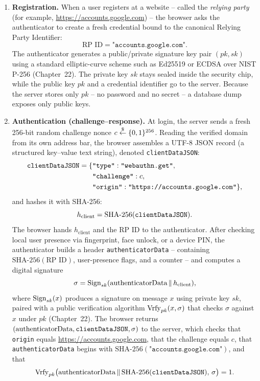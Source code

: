 \begin{enumerate}
  \item \textbf{Registration.} When a user registers at a website -- called the \emph{relying party} (for example, \url{https://accounts.google.com}) -- the browser asks the authenticator to create a fresh credential bound to the canonical Relying Party Identifier:
  \[
    \text{RP ID} = \texttt{"accounts.google.com"}.
  \]
  The authenticator generates a public/private signature key pair $(pk, sk)$ using a standard elliptic-curve scheme such as Ed25519 or ECDSA over NIST P-256 (Chapter~22). The private key $sk$ stays sealed inside the security chip, while the public key $pk$ and a credential identifier go to the server. Because the server stores only $pk$ -- no password and no secret -- a database dump exposes only public keys.
  \item \textbf{Authentication (challenge--response).} At login, the server sends a fresh 256-bit random challenge nonce $c \stackrel{\$}{\gets} \{0,1\}^{256}$. Reading the verified domain from its own address bar, the browser assembles a UTF-8 JSON record (a structured key--value text string), denoted \texttt{clientDataJSON}:
  \begin{align*}
    \text{\texttt{clientDataJSON}} = \{ & \texttt{"type"}: \texttt{"webauthn.get"}, \\
    & \texttt{"challenge"}: c, \\
    & \texttt{"origin"}: \texttt{"https://accounts.google.com"} \},
  \end{align*}
  and hashes it with SHA-256:
  \[
    h_{\text{client}} = \text{SHA-256}(\text{\texttt{clientDataJSON}}).
  \]
  The browser hands $h_{\text{client}}$ and the RP ID to the authenticator. After checking local user presence via fingerprint, face unlock, or a device PIN, the authenticator builds a header \texttt{authenticatorData} -- containing $\text{SHA-256}(\text{RP ID})$, user-presence flags, and a counter -- and computes a digital signature
  \[
    \sigma = \operatorname{Sign}_{sk}(\text{authenticatorData} \,\|\, h_{\text{client}}),
  \]
  where $\operatorname{Sign}_{sk}(x)$ produces a signature on message $x$ using private key $sk$, paired with a public verification algorithm $\operatorname{Vrfy}_{pk}(x, \sigma)$ that checks $\sigma$ against $x$ under $pk$ (Chapter~22). The browser returns $(\text{authenticatorData}, \text{\texttt{clientDataJSON}}, \sigma)$ to the server, which checks that \texttt{origin} equals \url{https://accounts.google.com}, that the challenge equals $c$, that \texttt{authenticatorData} begins with $\text{SHA-256}(\texttt{"accounts.google.com"})$, and that
  \[
    \operatorname{Vrfy}_{pk}\bigl(\text{authenticatorData} \,\|\, \text{SHA-256}(\text{\texttt{clientDataJSON}}),\, \sigma\bigr) = 1.
  \]
\end{enumerate}


